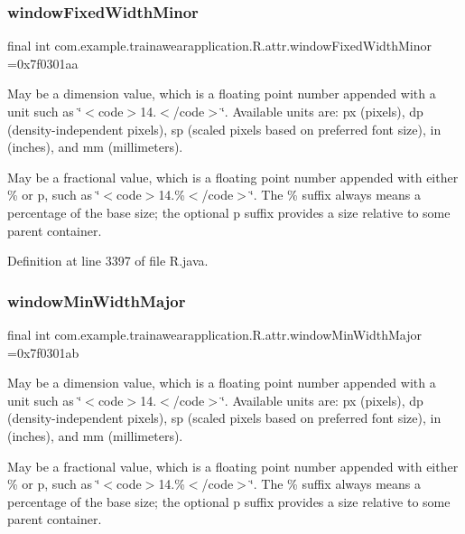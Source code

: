 \subsubsection{\texorpdfstring{windowFixedWidthMinor}{windowFixedWidthMinor}}
{\footnotesize\ttfamily final int com.\+example.\+trainawearapplication.\+R.\+attr.\+window\+Fixed\+Width\+Minor =0x7f0301aa\hspace{0.3cm}{\ttfamily [static]}}

May be a dimension value, which is a floating point number appended with a unit such as \char`\"{}$<$code$>$14.\+5sp$<$/code$>$\char`\"{}. Available units are\+: px (pixels), dp (density-\/independent pixels), sp (scaled pixels based on preferred font size), in (inches), and mm (millimeters). 

May be a fractional value, which is a floating point number appended with either \% or p, such as \char`\"{}$<$code$>$14.\%$<$/code$>$\char`\"{}. The \% suffix always means a percentage of the base size; the optional p suffix provides a size relative to some parent container. 

Definition at line 3397 of file R.\+java.

\mbox{\label{classcom_1_1example_1_1trainawearapplication_1_1_r_1_1attr_a50c58fbb0c69bef0302b1a976c09da4f}} 
\subsubsection{\texorpdfstring{windowMinWidthMajor}{windowMinWidthMajor}}
{\footnotesize\ttfamily final int com.\+example.\+trainawearapplication.\+R.\+attr.\+window\+Min\+Width\+Major =0x7f0301ab\hspace{0.3cm}{\ttfamily [static]}}

May be a dimension value, which is a floating point number appended with a unit such as \char`\"{}$<$code$>$14.\+5sp$<$/code$>$\char`\"{}. Available units are\+: px (pixels), dp (density-\/independent pixels), sp (scaled pixels based on preferred font size), in (inches), and mm (millimeters). 

May be a fractional value, which is a floating point number appended with either \% or p, such as \char`\"{}$<$code$>$14.\%$<$/code$>$\char`\"{}. The \% suffix always means a percentage of the base size; the optional p suffix provides a size relative to some parent container. 

